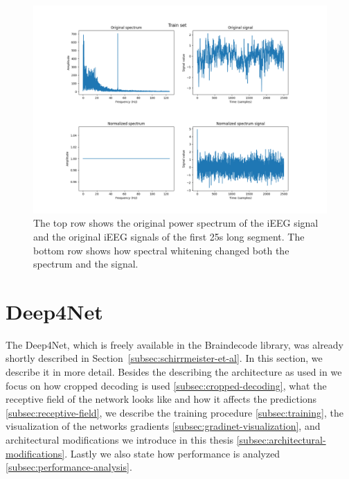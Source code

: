 \begin{figure}[!htbp]
\centering
\includegraphics[width=\linewidth]{img/ch3/spectral-whitening}
\caption[Spectral whitening on the train set]{The top row shows the original power spectrum of the iEEG signal and the original iEEG signals of the first 25s long segment.
The bottom row shows how spectral whitening changed both the spectrum and the signal.}
\label{fig:spectral-whitening}
\end{figure}


\section{Deep4Net}\label{sec:deep4net}
The Deep4Net, which is freely available in the Braindecode library, was already shortly described in Section~\ref{subsec:schirrmeister-et-al}.
In this section, we describe it in more detail. 
Besides the describing the architecture as used in \cite{Hammer-2021} we focus on how cropped decoding is used \ref{subsec:cropped-decoding}, what the receptive field of the network looks like and how it affects the predictions \ref{subsec:receptive-field}, we describe the training procedure \ref{subsec:training}, the visualization of the networks gradients \ref{subsec:gradinet-visualization}, and architectural modifications we introduce in this thesis \ref{subsec:architectural-modifications}. Lastly we also state how performance is analyzed \ref{subsec:performance-analysis}.


